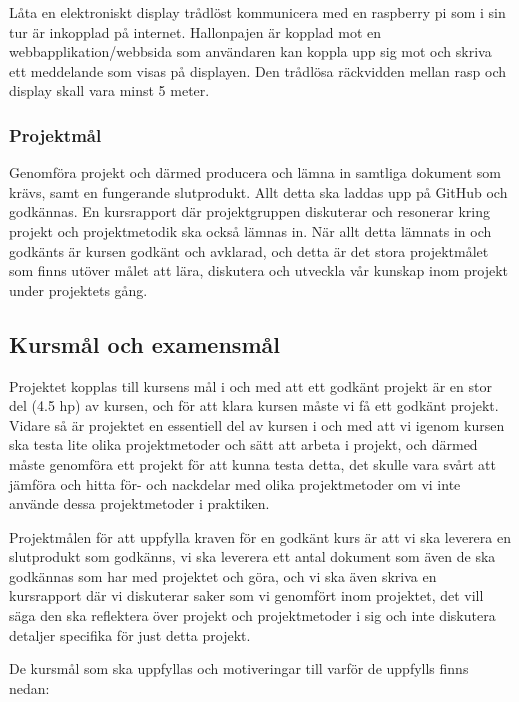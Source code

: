 \documentclass[11pt]{article}
\begin{document}
Låta en elektroniskt display trådlöst kommunicera med en raspberry pi
som i sin tur är inkopplad på internet. Hallonpajen är kopplad mot en
webbapplikation/webbsida som användaren kan koppla upp sig mot och
skriva ett meddelande som visas på displayen. Den trådlösa räckvidden
mellan rasp och display skall vara minst 5 meter.

\subsubsection{Projektmål}
\label{sec:orgcbe3f30}

Genomföra projekt och därmed producera och lämna in samtliga dokument
som krävs, samt en fungerande slutprodukt. Allt detta ska laddas upp på
GitHub och godkännas. En kursrapport där projektgruppen diskuterar och
resonerar kring projekt och projektmetodik ska också lämnas in. När allt
detta lämnats in och godkänts är kursen godkänt och avklarad, och detta
är det stora projektmålet som finns utöver målet att lära, diskutera och
utveckla vår kunskap inom projekt under projektets gång.

\subsection{Kursmål och examensmål}
\label{sec:org0f357b7}
Projektet kopplas till kursens mål i och med att ett godkänt projekt är
en stor del (4.5 hp) av kursen, och för att klara kursen måste vi få ett
godkänt projekt. Vidare så är projektet en essentiell del av kursen i
och med att vi igenom kursen ska testa lite olika projektmetoder och
sätt att arbeta i projekt, och därmed måste genomföra ett projekt för
att kunna testa detta, det skulle vara svårt att jämföra och hitta för-
och nackdelar med olika projektmetoder om vi inte använde dessa
projektmetoder i praktiken.

Projektmålen för att uppfylla kraven för en godkänt kurs är att vi ska
leverera en slutprodukt som godkänns, vi ska leverera ett antal dokument
som även de ska godkännas som har med projektet och göra, och vi ska
även skriva en kursrapport där vi diskuterar saker som vi genomfört inom
projektet, det vill säga den ska reflektera över projekt och
projektmetoder i sig och inte diskutera detaljer specifika för just
detta projekt.

De kursmål som ska uppfyllas och motiveringar till varför de uppfylls
finns nedan:
\end{document}
